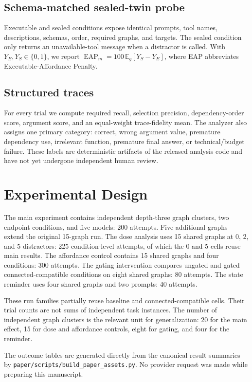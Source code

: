 \documentclass[twoside,11pt,preprint]{article}
\begin{document}
\subsection{Schema-matched sealed-twin probe}
Executable and sealed conditions expose identical prompts, tool names,
descriptions, schemas, order, required graphs, and targets. The sealed condition
only returns an unavailable-tool message when a distractor is called. With
\(Y_E,Y_S\in\{0,1\}\), we report
\(\operatorname{EAP}_m=100\,\mathbb{E}_g[Y_S-Y_E]\), where EAP abbreviates
Executable-Affordance Penalty.

\subsection{Structured traces}
For every trial we compute required recall, selection precision,
dependency-order score, argument score, and an equal-weight trace-fidelity
mean. The analyzer also assigns one primary category: correct, wrong argument
value, premature dependency use, irrelevant function, premature final answer,
or technical/budget failure. These labels are deterministic artifacts of the
released analysis code and have not yet undergone independent human review.

\section{Experimental Design}

The main experiment contains \MainGraphClusters{} independent depth-three graph
clusters, two endpoint conditions, and five models: 200 attempts. Five
additional graphs extend the original 15-graph run. The dose analysis uses 15
shared graphs at 0, 2, and 5 distractors: 225 condition-level attempts, of which
the 0 and 5 cells reuse main results. The affordance control contains 15
shared graphs and four conditions: 300 attempts. The gating intervention
compares ungated and gated connected-compatible conditions on eight shared
graphs: 80 attempts. The state reminder uses four shared graphs and two prompts:
40 attempts.

These run families partially reuse baseline and connected-compatible cells.
Their trial counts are not sums of independent task instances. The number of
independent graph clusters is the relevant unit for generalization: 20 for the
main effect, 15 for dose and affordance controls, eight for gating, and four for
the reminder.

The outcome tables are generated directly from the canonical result summaries by
\texttt{paper/scripts/build\_paper\_assets.py}. No provider request was made
while preparing this manuscript.
\end{document}
